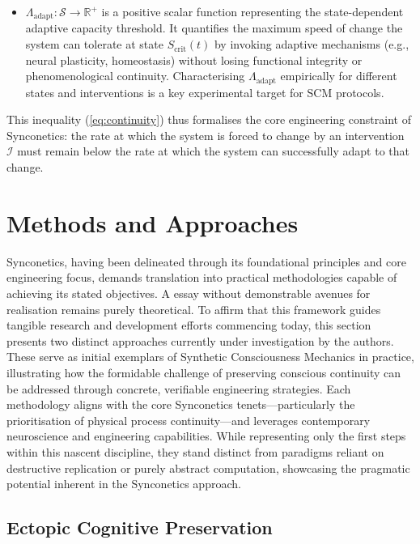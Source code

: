 \documentclass[10pt]{article}
\begin{document}
\begin{sloppypar}
\begin{itemize}
\begin{itemize}
            \item \( \Lambda_{\text{adapt}}: \mathcal{S} \to \mathbb{R}^+ \) is a positive scalar function representing the state-dependent adaptive capacity threshold. It quantifies the maximum speed of change the system can tolerate at state \( S_{\text{crit}}(t) \) by invoking adaptive mechanisms (e.g., neural plasticity, homeostasis) without losing functional integrity or phenomenological continuity. Characterising \( \Lambda_{\text{adapt}} \) empirically for different states and interventions is a key experimental target for SCM protocols.
          \end{itemize}

          This inequality (\autoref{eq:continuity}) thus formalises the core engineering constraint of Synconetics: the rate at which the system is forced to change by an intervention \( \mathcal{I} \) must remain below the rate at which the system can successfully adapt to that change.
  \end{itemize}

  \section{Methods and Approaches}
  \label{sec:methods}

  Synconetics, having been delineated through its foundational principles and core engineering focus, demands translation into practical methodologies capable of achieving its stated objectives. A essay without demonstrable avenues for realisation remains purely theoretical. To affirm that this framework guides tangible research and development efforts commencing today, this section presents two distinct approaches currently under investigation by the authors. These serve as initial exemplars of Synthetic Consciousness Mechanics in practice, illustrating how the formidable challenge of preserving conscious continuity can be addressed through concrete, verifiable engineering strategies. Each methodology aligns with the core Synconetics tenets—particularly the prioritisation of physical process continuity—and leverages contemporary neuroscience and engineering capabilities. While representing only the first steps within this nascent discipline, they stand distinct from paradigms reliant on destructive replication or purely abstract computation, showcasing the pragmatic potential inherent in the Synconetics approach.

  \subsection{Ectopic Cognitive Preservation}
  \label{sec:daniel-approach}


\end{sloppypar}
\end{document}
